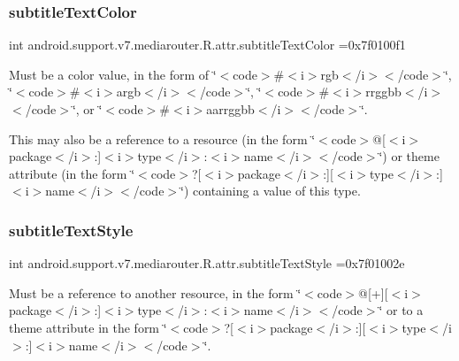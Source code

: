 \subsubsection{\texorpdfstring{subtitle\+Text\+Color}{subtitleTextColor}}
{\footnotesize\ttfamily int android.\+support.\+v7.\+mediarouter.\+R.\+attr.\+subtitle\+Text\+Color =0x7f0100f1\hspace{0.3cm}{\ttfamily [static]}}

Must be a color value, in the form of \char`\"{}$<$code$>$\#$<$i$>$rgb$<$/i$>$$<$/code$>$\char`\"{}, \char`\"{}$<$code$>$\#$<$i$>$argb$<$/i$>$$<$/code$>$\char`\"{}, \char`\"{}$<$code$>$\#$<$i$>$rrggbb$<$/i$>$$<$/code$>$\char`\"{}, or \char`\"{}$<$code$>$\#$<$i$>$aarrggbb$<$/i$>$$<$/code$>$\char`\"{}. 

This may also be a reference to a resource (in the form \char`\"{}$<$code$>$@\mbox{[}$<$i$>$package$<$/i$>$\+:\mbox{]}$<$i$>$type$<$/i$>$\+:$<$i$>$name$<$/i$>$$<$/code$>$\char`\"{}) or theme attribute (in the form \char`\"{}$<$code$>$?\mbox{[}$<$i$>$package$<$/i$>$\+:\mbox{]}\mbox{[}$<$i$>$type$<$/i$>$\+:\mbox{]}$<$i$>$name$<$/i$>$$<$/code$>$\char`\"{}) containing a value of this type. \mbox{\label{classandroid_1_1support_1_1v7_1_1mediarouter_1_1R_1_1attr_a44538ca09d79d732baf7e183450e704c}} 
\subsubsection{\texorpdfstring{subtitle\+Text\+Style}{subtitleTextStyle}}
{\footnotesize\ttfamily int android.\+support.\+v7.\+mediarouter.\+R.\+attr.\+subtitle\+Text\+Style =0x7f01002e\hspace{0.3cm}{\ttfamily [static]}}

Must be a reference to another resource, in the form \char`\"{}$<$code$>$@\mbox{[}+\mbox{]}\mbox{[}$<$i$>$package$<$/i$>$\+:\mbox{]}$<$i$>$type$<$/i$>$\+:$<$i$>$name$<$/i$>$$<$/code$>$\char`\"{} or to a theme attribute in the form \char`\"{}$<$code$>$?\mbox{[}$<$i$>$package$<$/i$>$\+:\mbox{]}\mbox{[}$<$i$>$type$<$/i$>$\+:\mbox{]}$<$i$>$name$<$/i$>$$<$/code$>$\char`\"{}. \mbox{\label{classandroid_1_1support_1_1v7_1_1mediarouter_1_1R_1_1attr_a7753b1cfb63c3bcdc0b823c703ca27d2}} 
